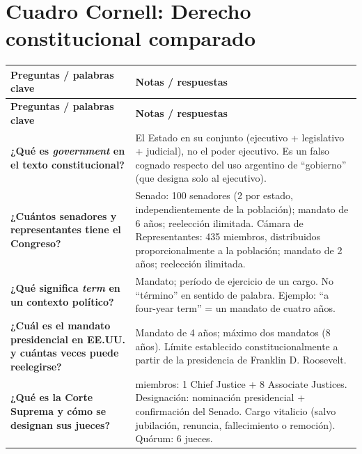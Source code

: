 \documentclass[12pt,oneside]{book}
\begin{document}
\chapter*{Cuadro Cornell: Derecho constitucional comparado}

\begin{longtable}{
    >{\raggedright\arraybackslash}p{}
    >{\raggedright\arraybackslash}p{}
}
\toprule
\textbf{Preguntas / palabras clave} & \textbf{Notas / respuestas} \\
\midrule
\endfirsthead
\toprule
\textbf{Preguntas / palabras clave} & \textbf{Notas / respuestas} \\
\midrule
\endhead
\textbf{¿Qué es \textit{government} en el texto constitucional?} &
El Estado en su conjunto (ejecutivo + legislativo + judicial), no el poder ejecutivo. Es un falso cognado respecto del uso argentino de ``gobierno'' (que designa solo al ejecutivo). \\

\textbf{¿Cuántos senadores y representantes tiene el Congreso?} &
Senado: 100 senadores (2 por estado, independientemente de la población); mandato de 6 años; reelección ilimitada. Cámara de Representantes: 435 miembros, distribuidos proporcionalmente a la población; mandato de 2 años; reelección ilimitada. \\

\textbf{¿Qué significa \textit{term} en un contexto político?} &
Mandato; período de ejercicio de un cargo. No ``término'' en sentido de palabra. Ejemplo: ``a four-year term'' = un mandato de cuatro años. \\

\textbf{¿Cuál es el mandato presidencial en EE.UU. y cuántas veces puede reelegirse?} &
Mandato de 4 años; máximo dos mandatos (8 años). Límite establecido constitucionalmente a partir de la presidencia de Franklin D. Roosevelt. \\

\textbf{¿Qué es la Corte Suprema y cómo se designan sus jueces?} &
9 miembros: 1 Chief Justice + 8 Associate Justices. Designación: nominación presidencial + confirmación del Senado. Cargo vitalicio (salvo jubilación, renuncia, fallecimiento o remoción). Quórum: 6 jueces. \\


\end{longtable}
\end{document}
